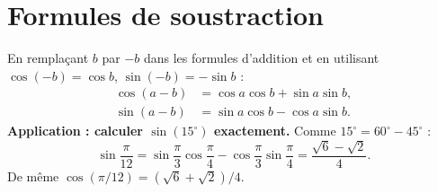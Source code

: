 \documentclass[../cours_spe_trigo.tex]{subfiles}
\begin{document}
\section{Formules de soustraction}
En remplaçant $b$ par $-b$ dans les formules d'addition et en utilisant $\cos(-b)=\cos b$, $\sin(-b)=-\sin b$ :
\[
\boxed{\begin{aligned}
\cos(a-b)&=\cos a\cos b+\sin a\sin b,\\
\sin(a-b)&=\sin a\cos b-\cos a\sin b.
\end{aligned}}
\]
\textbf{Application : calculer $\sin(15^\circ)$ exactement.} Comme $15^\circ=60^\circ-45^\circ$ :
\[
\sin\frac{\pi}{12}
=\sin\frac\pi3\cos\frac\pi4-\cos\frac\pi3\sin\frac\pi4
=\boxed{\frac{\sqrt6-\sqrt2}{4}}.
\]
De même $\cos(\pi/12)=(\sqrt6+\sqrt2)/4$.
\end{document}
